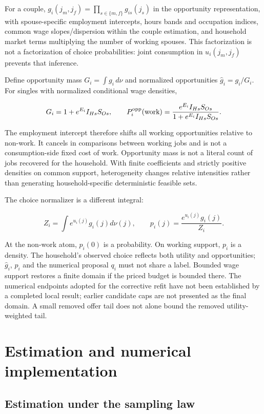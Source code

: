 \documentclass[11pt,a4paper]{article}
\begin{document}
For a couple, \(g_i(j_m,j_f)=\prod_{s\in\{m,f\}}g_{is}(j_s)\) in the opportunity representation, with spouse-specific employment intercepts, hours bands and occupation indices, common wage slopes/dispersion within the couple estimation, and household market terms multiplying the number of working spouses. This factorization is not a factorization of choice probabilities: joint consumption in \(u_i(j_m,j_f)\) prevents that inference.

Define opportunity mass \(G_i=\int g_i\,d\nu\) and normalized opportunities \(\widehat g_i=g_i/G_i\). For singles with normalized conditional wage densities,

\[G_i=1+e^{E_i}I_{Hs}S_{Os},\qquad
P_i^{\rm opp}(\text{work})=\frac{e^{E_i}I_{Hs}S_{Os}}{1+e^{E_i}I_{Hs}S_{Os}}.\]

The employment intercept therefore shifts all working opportunities relative to non-work. It cancels in comparisons between working jobs and is not a consumption-side fixed cost of work. Opportunity mass is not a literal count of jobs recovered for the household. With finite coefficients and strictly positive densities on common support, heterogeneity changes relative intensities rather than generating household-specific deterministic feasible sets.

The choice normalizer is a different integral:

\[Z_i=\int e^{u_i(j)}g_i(j)d\nu(j),\qquad p_i(j)=\frac{e^{u_i(j)}g_i(j)}{Z_i}.\]

At the non-work atom, \(p_i(0)\) is a probability. On working support, \(p_i\) is a density. The household's observed choice reflects both utility and opportunities; \(\widehat g_i\), \(p_i\) and the numerical proposal \(q_i\) must not share a label. Bounded wage support restores a finite domain if the priced budget is bounded there. The numerical endpoints adopted for the corrective refit have not been established by a completed local result; earlier candidate caps are not presented as the final domain. A small removed offer tail does not alone bound the removed utility-weighted tail.

\section{Estimation and numerical implementation}\label{estimation-and-numerical-implementation}

\subsection{Estimation under the sampling law}\label{estimation-under-the-sampling-law}
\end{document}
